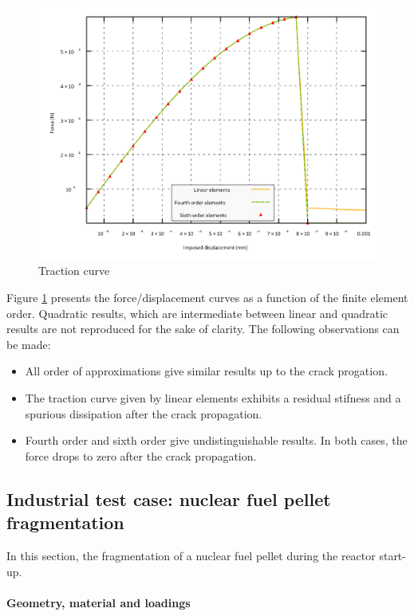 \begin{figure}[H]
  \centering
  \includegraphics[width=10.cm]{../chapter_02_ef_micromorphic/figures/shear-driven-fracture-damage-results-force.pdf}
  \caption{Traction curve}
  \label{fig:micromorphicdamage:traction_curve}
\end{figure}

Figure \ref{fig:micromorphicdamage:traction_curve} presents the
force/displacement curves as a function of the finite element order.
Quadratic results, which are intermediate between linear and quadratic
results are not reproduced for the sake of clarity. The following
observations can be made:

\begin{itemize}
  \item All order of approximations give similar results up to the crack
  progation.
  \item The traction curve given by linear elements exhibits a residual
  stifness and a spurious dissipation after the crack propagation.
  \item Fourth order and sixth order give undistinguishable results. In both
  cases, the force drops to zero after the crack propagation.
\end{itemize}

\subsection{Industrial test case: nuclear fuel pellet fragmentation}

In this section, the fragmentation of a nuclear fuel pellet during the
reactor start-up. 

\paragraph{Geometry, material and loadings}

